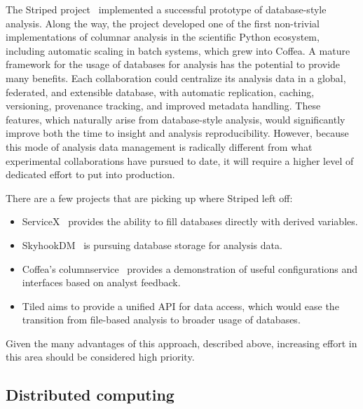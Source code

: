 \documentclass[12pt,a4paper]{article}
\begin{document}
The Striped project~\cite{Chang:2017ske,Gutsche:2020kmd} implemented a successful prototype of database-style analysis. Along the way, the project developed one of the first non-trivial implementations of columnar analysis in the scientific Python ecosystem, including automatic scaling in batch systems, which grew into Coffea. A mature framework for the usage of databases for analysis has the potential to provide many benefits. Each collaboration could centralize its analysis data in a global, federated, and extensible database, with automatic replication, caching, versioning, provenance tracking, and improved metadata handling. These features, which naturally arise from database-style analysis, would significantly improve both the time to insight and analysis reproducibility. However, because this mode of analysis data management is radically different from what experimental collaborations have pursued to date, it will require a higher level of dedicated effort to put into production.

There are a few projects that are picking up where Striped left off:

\begin{itemize}\setlength{\itemsep}{0 cm}
\item{ServiceX~\cite{Galewsky:2020xig} provides the ability to fill databases directly with derived variables.}
\item{SkyhookDM~\cite{lefevre:login20} is pursuing database storage for analysis data.}
\item{Coffea's columnservice~\cite{columnservice} provides a demonstration of useful configurations and interfaces based on analyst feedback.}
\item{Tiled aims to provide a unified API for data access, which would ease the transition from file-based analysis to broader usage of databases.}
\end{itemize}

Given the many advantages of this approach, described above, increasing effort in this area should be considered high priority.

\subsection{Distributed computing}
\end{document}
